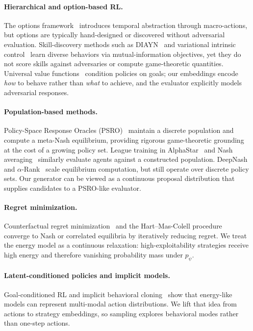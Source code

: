 \documentclass[11pt]{article}
\begin{document}
\paragraph{Hierarchical and option-based RL.}
The options framework~\cite{sutton1999options} introduces temporal abstraction through macro-actions, but options are typically hand-designed or discovered without adversarial evaluation.
Skill-discovery methods such as DIAYN~\cite{eysencbach2018diayn} and variational intrinsic control~\cite{gregor2016vic} learn diverse behaviors via mutual-information objectives, yet they do not score skills against adversaries or compute game-theoretic quantities.
Universal value functions~\cite{schaul2015uvfa} condition policies on goals; our embeddings encode \emph{how} to behave rather than \emph{what} to achieve, and the evaluator explicitly models adversarial responses.

\paragraph{Population-based methods.}
Policy-Space Response Oracles (PSRO)~\cite{lanctot2017psro} maintain a discrete population and compute a meta-Nash equilibrium, providing rigorous game-theoretic grounding at the cost of a growing policy set.
League training in AlphaStar~\cite{vinyals2019alphastar} and Nash averaging~\cite{balduzzi2019openspiel} similarly evaluate agents against a constructed population.
DeepNash~\cite{perolat2022deepnash} and $\alpha$-Rank~\cite{omidshafiei2019alpharank} scale equilibrium computation, but still operate over discrete policy sets.
Our generator can be viewed as a continuous proposal distribution that supplies candidates to a PSRO-like evaluator.

\paragraph{Regret minimization.}
Counterfactual regret minimization~\cite{zinkevich2007cfr} and the Hart--Mas-Colell procedure~\cite{hart2000ce} converge to Nash or correlated equilibria by iteratively reducing regret.
We treat the energy model as a continuous relaxation: high-exploitability strategies receive high energy and therefore vanishing probability mass under $p_\psi$.

\paragraph{Latent-conditioned policies and implicit models.}
Goal-conditioned RL and implicit behavioral cloning~\cite{florence2022ibc} show that energy-like models can represent multi-modal action distributions.
We lift that idea from actions to strategy embeddings, so sampling explores behavioral modes rather than one-step actions.
\end{document}
